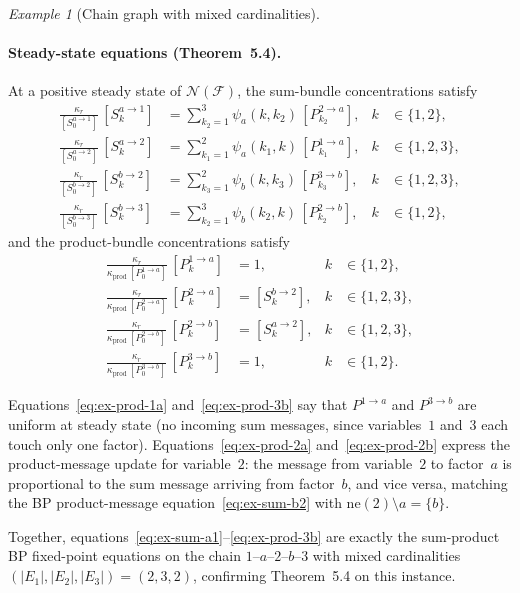 \documentclass{article}
\theoremstyle{plain}
\theoremstyle{definition}
\theoremstyle{remark}
\newtheorem{example}{Example}[section]
\newcommand{\<}{\langle}
\renewcommand{\>}{\rangle}
\begin{document}
\begin{example}[Chain graph with mixed cardinalities]
\paragraph{Steady-state equations (Theorem~5.4).}
At a positive steady state of $\mathcal{N}(\mathcal{F})$, the
sum-bundle concentrations satisfy
\begin{align}
\frac{\kappa_r}{[S^{a\to 1}_0]}\,[S^{a\to 1}_k]
&= \sum_{k_2=1}^{3}\psi_a(k,k_2)\,[P^{2\to a}_{k_2}],
  &k&\in\{1,2\},
\label{eq:ex-sum-a1}
\\[4pt]
\frac{\kappa_r}{[S^{a\to 2}_0]}\,[S^{a\to 2}_k]
&= \sum_{k_1=1}^{2}\psi_a(k_1,k)\,[P^{1\to a}_{k_1}],
  &k&\in\{1,2,3\},
\label{eq:ex-sum-a2}
\\[4pt]
\frac{\kappa_r}{[S^{b\to 2}_0]}\,[S^{b\to 2}_k]
&= \sum_{k_3=1}^{2}\psi_b(k,k_3)\,[P^{3\to b}_{k_3}],
  &k&\in\{1,2,3\},
\label{eq:ex-sum-b2}
\\[4pt]
\frac{\kappa_r}{[S^{b\to 3}_0]}\,[S^{b\to 3}_k]
&= \sum_{k_2=1}^{3}\psi_b(k_2,k)\,[P^{2\to b}_{k_2}],
  &k&\in\{1,2\},
\label{eq:ex-sum-b3}
\end{align}
and the product-bundle concentrations satisfy
\begin{align}
\frac{\kappa_r}{\kappa_{\mathrm{prod}}\,[P^{1\to a}_0]}\,[P^{1\to a}_k]
&= 1,
  &k&\in\{1,2\},
\label{eq:ex-prod-1a}
\\[4pt]
\frac{\kappa_r}{\kappa_{\mathrm{prod}}\,[P^{2\to a}_0]}\,[P^{2\to a}_k]
&= [S^{b\to 2}_k],
  &k&\in\{1,2,3\},
\label{eq:ex-prod-2a}
\\[4pt]
\frac{\kappa_r}{\kappa_{\mathrm{prod}}\,[P^{2\to b}_0]}\,[P^{2\to b}_k]
&= [S^{a\to 2}_k],
  &k&\in\{1,2,3\},
\label{eq:ex-prod-2b}
\\[4pt]
\frac{\kappa_r}{\kappa_{\mathrm{prod}}\,[P^{3\to b}_0]}\,[P^{3\to b}_k]
&= 1,
  &k&\in\{1,2\}.
\label{eq:ex-prod-3b}
\end{align}
 
\noindent
Equations~\eqref{eq:ex-prod-1a} and~\eqref{eq:ex-prod-3b}
say that $P^{1\to a}$ and $P^{3\to b}$ are uniform at steady state
(no incoming sum messages, since variables~$1$ and~$3$ each
touch only one factor).  Equations~\eqref{eq:ex-prod-2a}
and~\eqref{eq:ex-prod-2b} express the product-message
update for variable~$2$: the message from variable~$2$ to
factor~$a$ is proportional to the sum message arriving from
factor~$b$, and vice versa, matching the BP product-message
equation~\eqref{eq:ex-sum-b2} with $\mathrm{ne}(2)\setminus a = \{b\}$.
 
Together, equations~\eqref{eq:ex-sum-a1}--\eqref{eq:ex-prod-3b}
are exactly the sum-product BP fixed-point equations on the
chain $1$--$a$--$2$--$b$--$3$ with mixed cardinalities
$(|E_1|,|E_2|,|E_3|)=(2,3,2)$, confirming Theorem~5.4 on
this instance.
 

\end{example}
\end{document}
